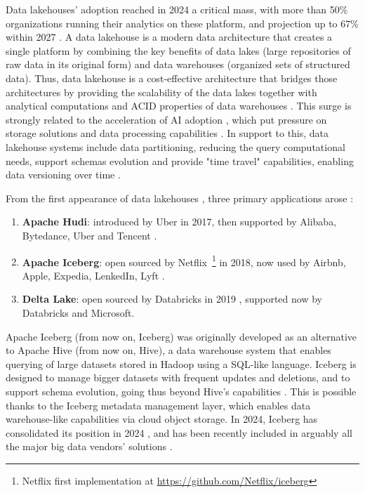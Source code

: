 Data lakehouses' adoption reached in 2024 a critical mass, with more than 50\% organizations running their analytics on these platform, and projection up to 67\% within 2027 \cite{StateDataLakehouse2025}. A data lakehouse is a modern data architecture that creates a single platform by combining the key benefits of data lakes (large repositories of raw data in its original form) and data warehouses (organized sets of structured data). Thus, data lakehouse is a cost-effective architecture \cite{DatalakehouseCostEfficiency} that bridges those architectures by providing the scalability of the data lakes together with analytical computations and \gls{ACID} properties of data warehouses \cite{lakehouse2021}. This surge is strongly related to the acceleration of AI adoption \cite{SurgeAI2024}, which put pressure on storage solutions and data processing capabilities \cite{StateDataLakehouse2025}. In support to this, data lakehouse systems include data partitioning, reducing the query computational needs, support schemas evolution and provide "time travel" capabilities, enabling data versioning over time \cite{crociDataLakehouseHype2022}.

From the first appearance of data lakehouses \cite{WhatLakehouse2020}, three primary applications arose \cite{ApacheHudiVs}: 
\begin{enumerate} 
    \item \textbf{Apache Hudi}: introduced by Uber in 2017, then supported by Alibaba, Bytedance, Uber and Tencent \cite{rajaperumalUberEngineeringIncremental2017}.
    \item \textbf{Apache Iceberg}: open sourced by Netflix~\footnote{Netflix first implementation at \url{https://github.com/Netflix/iceberg}} in 2018, now used by Airbnb, Apple, Expedia, LenkedIn, Lyft \cite{IcebergExamples2024}.
    \item \textbf{Delta Lake}: open sourced by Databricks in 2019 \cite{armbrustDeltaLakeHighperformance2020}, supported now by Databricks and Microsoft.
\end{enumerate}

Apache Iceberg (from now on, Iceberg) was originally developed as an alternative to Apache Hive (from now on, Hive), a data warehouse system that enables querying of large datasets stored in Hadoop using a \gls{SQL}-like language. Iceberg is designed to manage bigger datasets with frequent updates and deletions, and to support schema evolution, going thus beyond Hive's capabilities \cite{shiranApacheIcebergDefinitive2024}. This is possible thanks to the Iceberg metadata management layer, which enables data warehouse-like capabilities via cloud object storage. In 2024, Iceberg has consolidated its position in 2024 \cite{IcebergNewHadoop}, and has been recently included in arguably all the major big data vendors' solutions \cite{BigDataVendorIceberg}.


